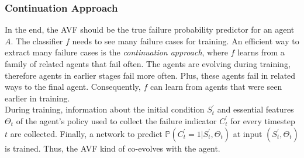 \subsubsection{Continuation Approach}
\label{continuation}
In the end, the AVF should be the true failure probability predictor for an agent $A$. The classifier $f$ needs to see many failure cases for training. An efficient way to extract many failure cases is the \textit{continuation approach}, where $f$ learns from a family of related agents that fail often. The agents are evolving during training, therefore agents in earlier stages fail more often. Plus, these agents fail in related ways to the final agent. Consequently, $f$ can learn from agents that were seen earlier in training.\\
During training, information about the initial condition $S_t^'$ and essential features  $\Theta_t$ of the agent's policy used to collect the failure indicator $C_t^'$ for every timestep $t$ are collected. Finally, a network to predict $\mathbb{P}(C_t^{'} = 1|S_t^{'}, \Theta_t)$ at input $(S_t^{'},\Theta_t)$ is trained. Thus, the AVF kind of co-evolves with the agent.
